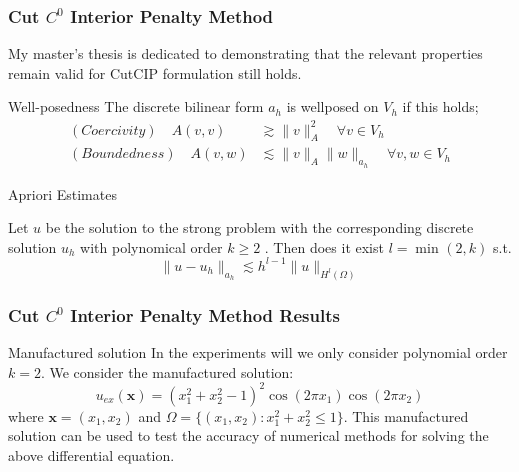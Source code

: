 \begin{frame}
\frametitle{ Cut $C^0$ Interior Penalty Method}

My master's thesis is dedicated to demonstrating that the relevant properties remain valid for CutCIP formulation still holds.

    \begin{block}{Well-posedness }
         The discrete bilinear form $a_{h}$ is wellposed on $V_{h}$ if this holds; \[
             \begin{split}
                 (Coercivity) \quad  A( v,v) &  \gtrsim  \| v \|_{A }^{ 2 } \quad  \forall v \in  V_{h} \\
            (Boundedness) \quad A( v,w) & \lesssim  \| v \|_{A }^{  }\| w \|_{a_{h} }^{  } \quad  \forall v,w \in  V_{h}
             \end{split}
        \]
    \end{block}

    \begin{block}{Apriori Estimates }

         Let $u$ be the solution to the strong problem with the corresponding discrete solution $u_{h}$ with polynomical order $k\ge 2$ .
        Then does it exist  $l = \min_{} ( 2, k)  $ s.t.
\[
        \| u - u_{h} \|_{a_{h}  }^{  } \lesssim  h^{l-1} \| u \|_{ H^{l} ( \Omega ) }^{  }
\]
    \end{block}
\end{frame}



\begin{frame}
\frametitle{ Cut $C^0$ Interior Penalty Method Results }


\begin{block}{Manufactured solution}
    In the experiments will we only consider polynomial order $k=2$.
We consider the manufactured solution:
$$
u_{ex}(\mathbf{x}) = \left(x_1^2 + x_2^2 - 1\right)^2 \cos(2\pi x_1) \cos(2\pi x_2)
$$
where $\mathbf{x}=(x_1,x_2)$ and $\Omega=\{(x_1,x_2): x_1^2 + x_2^2 \le  1\}$.
This manufactured solution can be used to test the accuracy of numerical methods for solving the above differential equation.
\end{block}
\end{frame}



